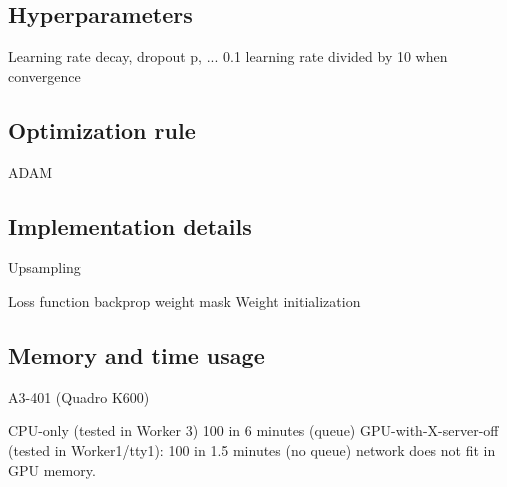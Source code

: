 \subsection{Hyperparameters}
Learning rate decay, dropout p, ...
0.1 learning rate divided by 10 when convergence

\subsection{Optimization rule}
ADAM


\subsection{Implementation details}
Upsampling

Loss function backprop weight mask
Weight initialization

\subsection{Memory and time usage}
A3-401 (Quadro K600)

CPU-only (tested in Worker 3) 100 in 6 minutes (queue)
GPU-with-X-server-off (tested in Worker1/tty1): 100 in 1.5 minutes (no queue)
network does not fit in GPU memory.
